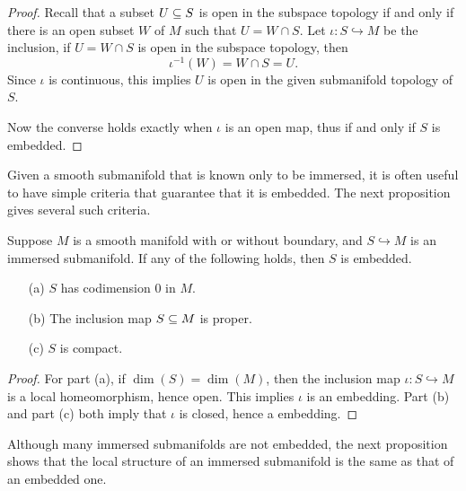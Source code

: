 \begin{proof}
Recall that a subset $U\subseteq S$ is open in the subspace topology if and only if there is an open subset $W$ of $M$ such that $U=W\cap S$. Let $\iota:S\hookrightarrow M$ be the inclusion, if $U=W\cap S$ is open in the subspace topology, then
\[\iota^{-1}(W)=W\cap S=U.\]
Since $\iota$ is continuous, this implies $U$ is open in the given submanifold topology of $S$.\par
Now the converse holds exactly when $\iota$ is an open map, thus if and only if $S$ is embedded.
\end{proof}
Given a smooth submanifold that is known only to be immersed, it is often useful
to have simple criteria that guarantee that it is embedded. The next proposition gives
several such criteria.
\begin{proposition}\label{immersed is embedd if}
Suppose $M$ is a smooth manifold with or without boundary, and $S\hookrightarrow M$ is an immersed submanifold. If any of the following holds, then $S$ is embedded.
\begin{itemize}
\item[(a)]$S$ has codimension $0$ in $M$.
\item[(b)]The inclusion map $S\subseteq M$ is proper.
\item[(c)]$S$ is compact.
\end{itemize}
\end{proposition}
\begin{proof}
For part (a), if $\dim(S)=\dim(M)$, then the inclusion map $\iota:S\hookrightarrow M$ is a local homeomorphism, hence open. This implies $\iota$ is an embedding. Part (b) and part (c) both imply that $\iota$ is closed, hence a embedding.
\end{proof}
Although many immersed submanifolds are not embedded, the next proposition
shows that the local structure of an immersed submanifold is the same as that of an embedded one.
